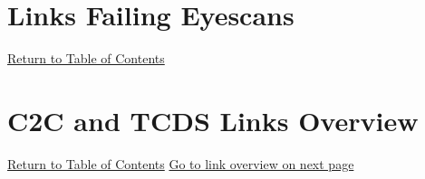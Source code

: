 \documentclass{report}
\newcounter{nextpage}
\begin{document}





\chapter{Links Failing Eyescans}
\hyperlink{MyToc}{Return to Table of Contents} \newline \newline

\chapter{C2C and TCDS Links Overview}
\hyperlink{MyToc}{Return to Table of Contents} \newline \newline
\setcounter{nextpage}{\thepage}
\hyperlink{page.\the\value{nextpage}}{Go to link overview on next page} \newpage
\end{document}
